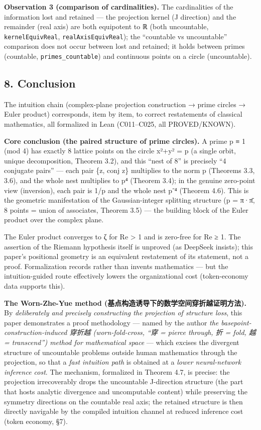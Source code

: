 \documentclass[
]{article}
\begin{document}
\textbf{Observation 3 (comparison of cardinalities).} The cardinalities
of the information lost and retained --- the projection kernel (J
direction) and the remainder (real axis) are both equipotent to ℝ (both
uncountable, \texttt{kernelEquivReal}, \texttt{realAxisEquivReal}); the
``countable vs uncountable'' comparison does not occur between lost and
retained; it holds between primes (countable,
\texttt{primes\_countable}) and continuous points on a circle
(uncountable).

\subsection{8. Conclusion}\label{conclusion}

The intuition chain (complex-plane projection construction → prime
circles → Euler product) corresponds, item by item, to correct
restatements of classical mathematics, all formalized in Lean
(C011--C025, all PROVED/KNOWN).

\textbf{Core conclusion (the paired structure of prime circles).} A
prime p ≡ 1 (mod 4) has exactly 8 lattice points on the circle x²+y² = p
(a single orbit, unique decomposition, Theorem 3.2), and this ``nest of
8'' is precisely ``4 conjugate pairs'' --- each pair \{z, conj z\}
multiplies to the norm p (Theorems 3.3, 3.6), and the whole nest
multiplies to p⁴ (Theorem 3.4); in the genuine zero-point view
(inversion), each pair is 1/p and the whole nest p⁻⁴ (Theorem 4.6). This
is the geometric manifestation of the Gaussian-integer splitting
structure (p = π·π̄, 8 points = union of associates, Theorem 3.5) --- the
building block of the Euler product over the complex plane.

The Euler product converges to ζ for Re \textgreater{} 1 and is
zero-free for Re ≥ 1. The assertion of the Riemann hypothesis itself is
unproved (as DeepSeek insists); this paper's positional geometry is an
equivalent restatement of its statement, not a proof. Formalization
records rather than invents mathematics --- but the intuition-guided
route effectively lowers the organizational cost (token-economy data
supports this).

\textbf{The Worn-Zhe-Yue method
(基点构造诱导下的数学空间穿折越证明方法).} By \emph{deliberately and
precisely constructing the projection of structure loss}, this paper
demonstrates a proof methodology --- named by the author \emph{the
basepoint-construction-induced 穿折越 (worn-fold-cross, ``穿 = pierce
through, 折 = fold, 越 = transcend'') method for mathematical space} ---
which excises the divergent structure of uncountable problems outside
human mathematics through the projection, so that a \emph{fast intuition
path} is obtained at a \emph{lower neural-network inference cost}. The
mechanism, formalized in Theorem 4.7, is precise: the projection
irrecoverably drops the uncountable J-direction structure (the part that
hosts analytic divergence and uncomputable content) while preserving the
symmetry directions on the countable real axis; the retained structure
is then directly navigable by the compiled intuition channel at reduced
inference cost (token economy, §7).
\end{document}
